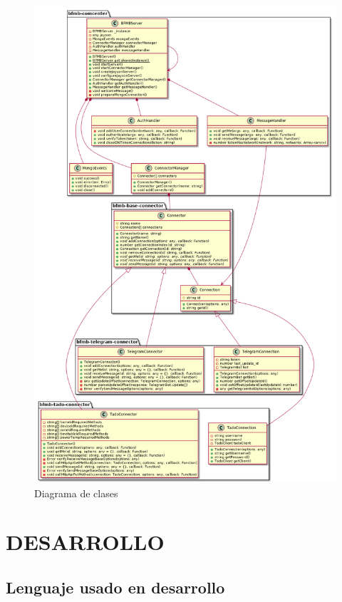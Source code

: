 \documentclass[spanish,12pt, a4paper, twoside]{paper}
\let\oldsection\section
\def\section{\cleardoublepage\oldsection}
\begin{document}
\begin{figure}
\centering
	\includegraphics[width=\textwidth]{recursos/classes}
\caption{Diagrama de clases}
\label{fig:Diagrama de clases}
\end{figure}

\section{DESARROLLO}

\subsection{Lenguaje usado en desarrollo}
\end{document}
